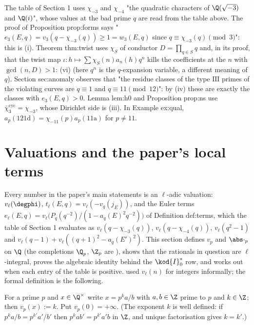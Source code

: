 \begin{paperlink}\label{pl:rings:characters}
The table of Section 1 uses $\chi_{-3}$ and $\chi_{-4}$ "the quadratic characters of $\Q(\sqrt{-3})$ and $\Q(i)$", whose values at the bad prime $q$
are read from the table above. The proof of Proposition prop:forms says "$e_3(E,q)=v_3(q-\chi_{-3}(q))\ge1=w_3(E,q)$ since $q\equiv\chi_{-3}(q)\pmod3$":
this is (i). Theorem thm:twist uses $\chi_S$ of conductor $D=\prod_{q\in S}q$ and, in its proof, that the twist map
$\iota\colon h\mapsto\sum\chi_S(n)a_n(h)q^n$ kills the coefficients at the $n$ with $\gcd(n,D)>1$: (vi) (here $q^n$ is the
$q$-expansion variable, a different meaning of $q$). Section sec:anomaly observes that "the residue classes of the type $\mathrm{III}$
primes of the violating curves are $q\equiv1$ and $q\equiv11\pmod{12}$": by (iv) these are exactly the classes with $e_3(E,q)>0$. Lemma lem:h0 and
Proposition prop:ns use $\bar\chi_3^{\mathrm{cyc}}=\chi_{-3}$, whose Dirichlet side is (iii). In Example ex:qual, $a_p(\text{121d})=\chi_{-11}(p)a_p(\text{11a})$ for
$p\ne11$.
\end{paperlink}

\section{Valuations and the paper's local terms}\label{sec:rings:valuations}

Every number in the paper's main statements is an $\ell$-adic valuation: $v_\ell(\degphi)$, $t_\ell(E,q)=v_\ell(-v_q(j_E))$, and the Euler terms
$e_\ell(E,q)=v_\ell\bigl(P_q(q^{-2})/(1-a_q(E)^2q^{-2})\bigr)$ of Definition def:terms, which the table of Section 1 evaluates as $v_\ell(q-\chi_{-3}(q))$,
$v_\ell(q-\chi_{-4}(q))$, $v_\ell(q^2-1)$ and $v_\ell(q-1)+v_\ell((q+1)^2-a_q(E')^2)$. This section defines $v_p$ and $\abs\cdot_p$ on $\Q$ (the completions $\Q_p$, $\Z_p$
are ), shows that the rationals in question are $\ell$-integral, proves the algebraic identity behind the $\kod{I}_0^*$ row,
and works out when each entry of the table is positive.  used $v_\ell(n)$ for integers informally; the formal
definition is the following.

\begin{definition}\label{def:rings:valuation}
For a prime $p$ and $x\in\Q^\times$ write $x=p^ka/b$ with $a,b\in\Z$ prime to $p$ and $k\in\Z$; then $v_p(x):=k$. Put $v_p(0)=+\infty$. (The exponent $k$ is well
defined: if $p^ka/b=p^{k'}a'/b'$ then $p^kab'=p^{k'}a'b$ in $\Z$, and unique factorisation gives $k=k'$.)
\end{definition}

